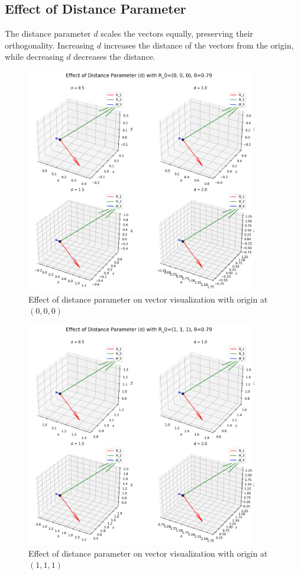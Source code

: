 \subsection{Effect of Distance Parameter}

The distance parameter $d$ scales the vectors equally, preserving their orthogonality. Increasing $d$ increases the distance of the vectors from the origin, while decreasing $d$ decreases the distance.

\begin{figure}[H]
    \centering
    \includegraphics[width=0.9\textwidth]{figures/d_effect_R0_0_0_0.png}
    \caption{Effect of distance parameter on vector visualization with origin at $(0,0,0)$}
    \label{fig:example_distance_effect_default}
\end{figure}

\begin{figure}[H]
    \centering
    \includegraphics[width=0.9\textwidth]{figures/d_effect_R0_1_1_1.png}
    \caption{Effect of distance parameter on vector visualization with origin at $(1,1,1)$}
    \label{fig:example_distance_effect_custom1}
\end{figure}

